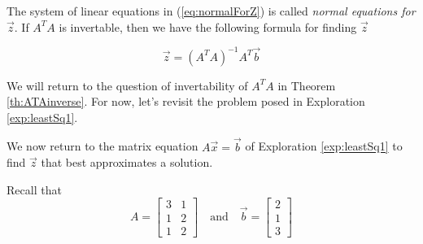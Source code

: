 \documentclass{ximera}
\begin{document}
The system of linear equations in (\ref{eq:normalForZ}) is called \emph{normal equations for} $\vec{z}$.  If $A^TA$ is invertable, then we have the following formula for finding $\vec{z}$

\begin{equation}\label{eq:leastSquaresZ}
    \vec{z}=(A^TA)^{-1}A^T\vec{b}
\end{equation}

We will return to the question of invertability of $A^TA$ in Theorem \ref{th:ATAinverse}.  For now, let's revisit the problem posed in Exploration \ref{exp:leastSq1}.

\begin{example}\label{ex:leastSquares1}
We now return to the matrix equation $A\vec{x}=\vec{b}$ of Exploration \ref{exp:leastSq1} to find $\vec{z}$ that best approximates a solution.

\begin{explanation}
    Recall that $$A=\begin{bmatrix}3 & 1\\1 & 2\\1 & 2\end{bmatrix}\quad\text{and}\quad \vec{b}=\begin{bmatrix}2\\1\\3\end{bmatrix}$$


\end{explanation}
\end{example}
\end{document}
